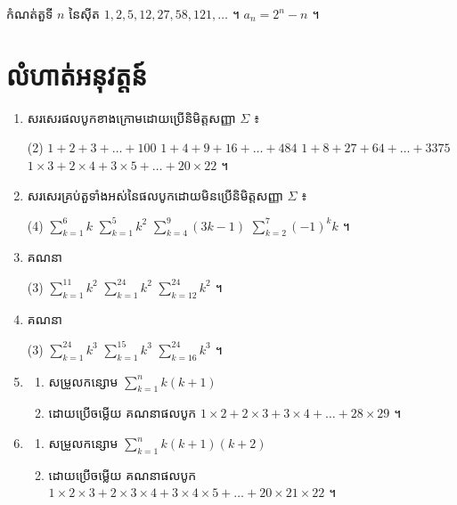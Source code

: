 \begin{pro}
កំណត់តួទី $n$ នៃស៊ីត $1, 2, 5, 12, 27, 58, 121, \ldots$ ។
\ans
$a_n = 2^n - n$ ។
\end{pro}

\section*{លំហាត់អនុវត្តន៍}
\begin{enumerate}[1]
  \item សរសេរផលបូកខាងក្រោមដោយប្រើនិមិត្តសញ្ញា $\Sigma$ ៖
  \begin{tasks}(2)
    \task $1 + 2 + 3 + \ldots + 100$
    \task $1 + 4 + 9 + 16 + \ldots + 484$
    \task $1 + 8 + 27 + 64 + \ldots + 3375$
    \task $1 \times 3 + 2 \times 4 + 3 \times 5 + \ldots + 20 \times 22$ ។
  \end{tasks}
  \item សរសេរគ្រប់តួទាំងអស់នៃផលបូកដោយមិនប្រើនិមិត្តសញ្ញា $\Sigma$ ៖
  \begin{tasks}(4)
    \task $\displaystyle\sum_{k=1}^{6} k$
    \task $\displaystyle\sum_{k=1}^{5} k^2$
    \task $\displaystyle\sum_{k=4}^{9} (3k - 1)$
    \task $\displaystyle\sum_{k=2}^{7} (-1)^k k$ ។
  \end{tasks}
  \item គណនា
  \begin{tasks}(3)
    \task $\displaystyle\sum_{k=1}^{11} k^2$
    \task $\displaystyle\sum_{k=1}^{24} k^2$
    \task $\displaystyle\sum_{k=12}^{24} k^2$ ។
  \end{tasks}
  \item គណនា
  \begin{tasks}(3)
    \task $\displaystyle\sum_{k=1}^{24} k^3$
    \task $\displaystyle\sum_{k=1}^{15} k^3$
    \task $\displaystyle\sum_{k=16}^{24} k^3$ ។
  \end{tasks}
  \item \begin{enumerate}[a]
    \item សម្រួលកន្សោម $\displaystyle\sum_{k=1}^{n} k(k+1)$
    \item ដោយប្រើចម្លើយ គណនាផលបូក $1 \times 2 + 2 \times 3 + 3 \times 4 + \ldots + 28 \times 29$ ។
  \end{enumerate}
  \item \begin{enumerate}[a]
    \item សម្រួលកន្សោម $\displaystyle\sum_{k=1}^{n} k(k+1)(k+2)$
    \item ដោយប្រើចម្លើយ គណនាផលបូក $1 \times 2 \times 3 + 2 \times 3 \times 4 + 3 \times 4 \times 5 + \ldots + 20 \times 21 \times 22$ ។

\end{enumerate}
\end{enumerate}

